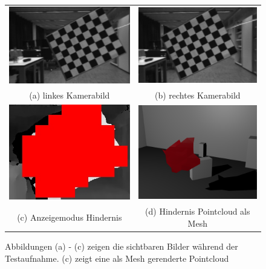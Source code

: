 	\begin{figure}[h]
		\centering
		\begin{tabular}{c c}
			\includegraphics[width=6.0cm]{img/evaluation/test_set/_test_3_left}&
   			\includegraphics[width=6.0cm]{img/evaluation/test_set/_test_3_right}\\
			(a) linkes Kamerabild & (b) rechtes Kamerabild\\
			\includegraphics[width=6.0cm]{img/evaluation/test_set/_test_3_disparity}&
		    \includegraphics[width=6.0cm]{img/evaluation/test_set/rendered_obstacle}\\
			(c) Anzeigemodus Hindernis & (d) Hindernis Pointcloud als Mesh
		\end{tabular}
		\label{fig:test_viewing}
		\caption{Abbildungen (a) - (c) zeigen die sichtbaren Bilder während der Testaufnahme. (c) zeigt eine als Mesh gerenderte Pointcloud}
	\end{figure}
    
